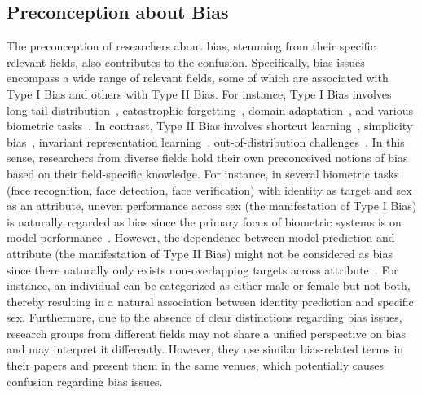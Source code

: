 \subsection{Preconception about Bias}
The preconception of researchers about bias, stemming from their specific relevant fields, also contributes to the confusion.
Specifically, bias issues encompass a wide range of relevant fields, some of which are associated with Type I Bias and others with Type II Bias.
For instance, Type I Bias involves long-tail distribution~\cite{long_tail}, catastrophic forgetting~\cite{kirkpatrick2017overcoming}, domain adaptation~\cite{li2014learning}, and various biometric tasks~\cite{xiao2023name,hutiri2022bias}.
In contrast, Type II Bias involves shortcut learning~\cite{shortcut_learning}, simplicity bias~\cite{simplicitybias}, invariant representation learning~\cite{DP_FFVAE}, out-of-distribution challenges~\cite{shen2021towards}.
In this sense, researchers from diverse fields hold their own preconceived notions of bias based on their field-specific knowledge. 
For instance, in several biometric tasks (\eg face recognition, face 
detection, face verification) with identity as target and sex as an attribute, uneven performance across sex (the manifestation of Type I Bias) is naturally regarded as bias since the primary focus of biometric systems is on model performance~\cite{robinson2020face}.
However, the dependence between model prediction and attribute (the manifestation of Type II Bias) might not be considered as bias since there naturally only exists non-overlapping targets across attribute~\cite{RFW_IMAN}. For instance, an individual can be categorized as either male or female but not both, thereby resulting in a natural association between identity prediction and specific sex.
Furthermore, due to the absence of clear distinctions regarding bias issues, research groups from different fields may not share a unified perspective on bias and may interpret it differently. However, they use similar bias-related terms in their papers and present them in the same venues, which potentially causes confusion regarding bias issues.























